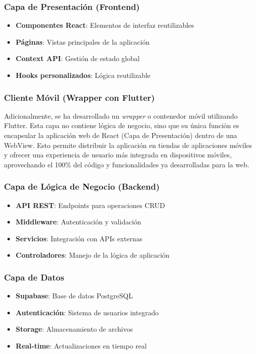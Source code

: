 \documentclass[12pt,a4paper]{report}
\begin{document}
\subsubsection{Capa de Presentación (Frontend)}
\begin{itemize}
    \item \textbf{Componentes React}: Elementos de interfaz reutilizables
    \item \textbf{Páginas}: Vistas principales de la aplicación
    \item \textbf{Context API}: Gestión de estado global
    \item \textbf{Hooks personalizados}: Lógica reutilizable
\end{itemize}

\subsubsection{Cliente Móvil (Wrapper con Flutter)}
Adicionalmente, se ha desarrollado un \textit{wrapper} o contenedor móvil utilizando Flutter. Esta capa no contiene lógica de negocio, sino que su única función es encapsular la aplicación web de React (Capa de Presentación) dentro de una WebView. Esto permite distribuir la aplicación en tiendas de aplicaciones móviles y ofrecer una experiencia de usuario más integrada en dispositivos móviles, aprovechando el 100\% del código y funcionalidades ya desarrolladas para la web.

\subsubsection{Capa de Lógica de Negocio (Backend)}
\begin{itemize}
    \item \textbf{API REST}: Endpoints para operaciones CRUD
    \item \textbf{Middleware}: Autenticación y validación
    \item \textbf{Servicios}: Integración con APIs externas
    \item \textbf{Controladores}: Manejo de la lógica de aplicación
\end{itemize}

\subsubsection{Capa de Datos}
\begin{itemize}
    \item \textbf{Supabase}: Base de datos PostgreSQL
    \item \textbf{Autenticación}: Sistema de usuarios integrado
    \item \textbf{Storage}: Almacenamiento de archivos
    \item \textbf{Real-time}: Actualizaciones en tiempo real
\end{itemize}
\end{document}
